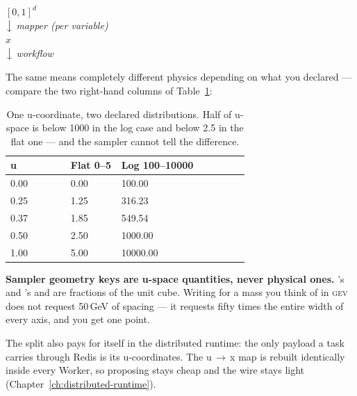 \begin{marginfigure}
\centering
{} $[0,1]^d$\\[2pt]
$\big\downarrow$ \emph{mapper (per variable)}\\[2pt]
 $x$\\[2pt]
$\big\downarrow$ \emph{workflow}\\[2pt]
\caption{Samplers propose in the unit cube; the Worker maps to physical values.}
\label{fig:uspace}
\end{marginfigure}

The same  means completely different physics depending on what you declared ---
compare the two right-hand columns of Table~\ref{tab:uspace-mapping}:

\begin{table}[ht]
  \footnotesize
  \begingroup
  \setlength{\tabcolsep}{0pt}
  \begin{tabular}{@{}p{0.255\linewidth}p{0.213\linewidth}p{0.532\linewidth}@{}}
    \toprule
    \textbf{u} & \textbf{Flat 0--5} & \textbf{Log 100--10000} \\
    \midrule
    0.00 & 0.00 & 100.00 \\
    0.25 & 1.25 & 316.23 \\
    0.37 & 1.85 & 549.54 \\
    0.50 & 2.50 & 1000.00 \\
    1.00 & 5.00 & 10000.00 \\
    \bottomrule
  \end{tabular}
  \endgroup
  \caption[One u-coordinate, two declared distributions.]{One u-coordinate, two declared
  distributions. Half of u-space is below 1000 in the log case and below 2.5 in the flat
  one --- and the sampler cannot tell the difference.}
  \label{tab:uspace-mapping}
\end{table}

\begin{jwarn}
\textbf{Sampler geometry keys are u-space quantities, never physical ones.}
's  and 's
 and  are fractions of the unit cube. Writing
 for a mass you think of in \textsc{gev} does not request 50\,GeV of
spacing --- it requests fifty times the entire width of every axis, and you get one
point.
\end{jwarn}

The split also pays for itself in the distributed runtime: the only payload a task
carries through Redis is its u-coordinates. The u\,$\rightarrow$\,x map is rebuilt
identically inside every Worker, so proposing stays cheap and the wire stays light
(Chapter~\ref{ch:distributed-runtime}).

